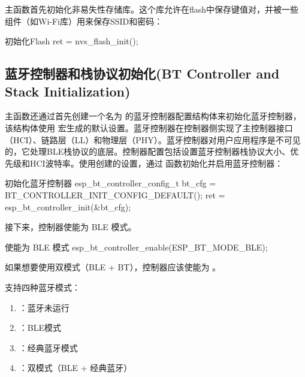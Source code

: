 \documentclass[lang=cn,newtx,10pt,scheme=chinese]{elegantbook}
\begin{document}
主函数首先初始化非易失性存储库。这个库允许在flash中保存键值对，并被一些组件（如Wi-Fi库）用来保存SSID和密码：

\begin{mycode}{初始化Flash}
ret = nvs_flash_init();
\end{mycode}

\subsection{蓝牙控制器和栈协议初始化(BT Controller and Stack Initialization)}

主函数还通过首先创建一个名为  的蓝牙控制器配置结构体来初始化蓝牙控制器，该结构体使用  宏生成的默认设置。蓝牙控制器在控制器侧实现了主控制器接口（HCI）、链路层（LL）和物理层（PHY）。蓝牙控制器对用户应用程序是不可见的，它处理BLE栈协议的底层。控制器配置包括设置蓝牙控制器栈协议大小、优先级和HCI波特率。使用创建的设置，通过  函数初始化并启用蓝牙控制器：

\begin{mycode}{初始化蓝牙控制器}
esp_bt_controller_config_t bt_cfg = BT_CONTROLLER_INIT_CONFIG_DEFAULT();
ret = esp_bt_controller_init(&bt_cfg);
\end{mycode}

接下来，控制器使能为 BLE 模式。

\begin{mycode}{使能为 BLE 模式}
esp_bt_controller_enable(ESP_BT_MODE_BLE);
\end{mycode}

\begin{marker}
如果想要使用双模式（BLE + BT），控制器应该使能为  。
\end{marker}

支持四种蓝牙模式：

\begin{enumerate}
\item {}：蓝牙未运行
\item {}：BLE模式
\item {}：经典蓝牙模式
\item {}：双模式（BLE + 经典蓝牙）
\end{enumerate}
\end{document}
